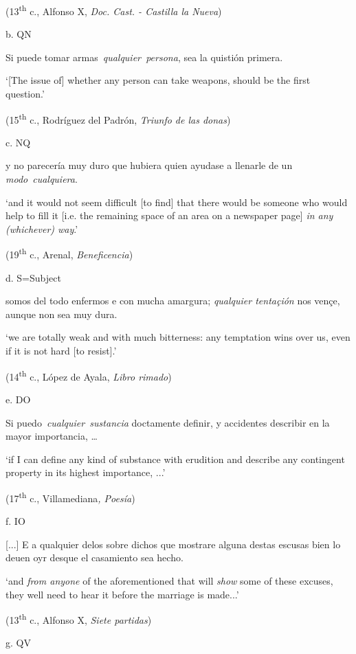 \documentclass[output=paper]{langscibook}
\begin{document}
    (13\textsuperscript{th} c., Alfonso X, \textit{Doc. Cast. - Castilla la Nueva})

  b.  QN

    Si puede tomar armas~\textit{qualquier~persona}, sea la quistión primera. 

    ‘[The issue of] whether any person can take weapons, should be the first question.’

    (15\textsuperscript{th} c., Rodríguez del Padrón, \textit{Triunfo de las donas})

  c.  NQ

    y no parecería muy duro que hubiera quien ayudase a llenarle de un \textit{modo}~\textit{cualquiera}. 

    ‘and it would not seem difficult [to find] that there would be someone who would help to fill it [i.e. the remaining space of an area on a newspaper page] \textit{in any (whichever) way}.’

    (19\textsuperscript{th} c., Arenal, \textit{Beneficencia})

  d.  S=Subject

    somos del todo enfermos e con mucha amargura; \textit{qualquier tentaçión} nos vençe, aunque non sea muy dura. 

    ‘we are totally weak and with much bitterness: any temptation wins over us, even if it is not hard [to resist].’

    (14\textsuperscript{th} c., López de Ayala, \textit{Libro rimado})

  e.  DO

    Si puedo~\textit{cualquier~sustancia} doctamente definir, y accidentes describir en la mayor importancia, … 

    ‘if I can define any kind of substance with erudition and describe any contingent property in its highest importance, ...’

    (17\textsuperscript{th} c., Villamediana\textit{, Poesía})

  f.  IO

    [...] E a qualquier delos sobre dichos que mostrare alguna destas escusas bien lo deuen oyr desque el casamiento sea hecho. 

    ‘and \textit{from anyone} of the aforementioned that will \textit{show} some of these excuses, they well need to hear it before the marriage is made...’

    (13\textsuperscript{th} c., Alfonso X, \textit{Siete partidas})

  g.  QV
\end{document}
